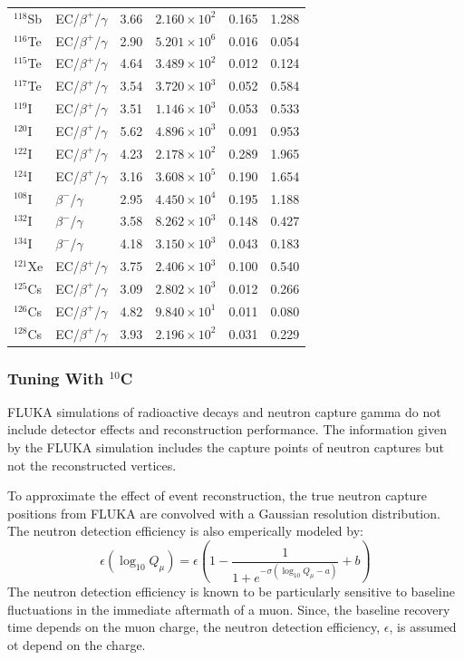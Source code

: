 \begin{table}[ht]
\begin{tabular}{lllccc}
$^{118}$Sb & EC/$\beta^+$/$\gamma$ & 3.66 & $2.160 \times 10^2$ & 0.165 & 1.288 \\
$^{116}$Te & EC/$\beta^+$/$\gamma$ & 2.90 & $5.201 \times 10^6$ & 0.016 & 0.054 \\
$^{115}$Te & EC/$\beta^+$/$\gamma$ & 4.64 & $3.489 \times 10^2$ & 0.012 & 0.124 \\
$^{117}$Te & EC/$\beta^+$/$\gamma$ & 3.54 & $3.720 \times 10^3$ & 0.052 & 0.584 \\
$^{119}$I & EC/$\beta^+$/$\gamma$ & 3.51 & $1.146 \times 10^3$ & 0.053 & 0.533 \\
$^{120}$I & EC/$\beta^+$/$\gamma$ & 5.62 & $4.896 \times 10^3$ & 0.091 & 0.953 \\
$^{122}$I & EC/$\beta^+$/$\gamma$ & 4.23 & $2.178 \times 10^2$ & 0.289 & 1.965 \\
$^{124}$I & EC/$\beta^+$/$\gamma$ & 3.16 & $3.608 \times 10^5$ & 0.190 & 1.654 \\
$^{108}$I & $\beta^-$/$\gamma$ & 2.95 & $4.450 \times 10^4$ & 0.195 & 1.188 \\
$^{132}$I & $\beta^-$/$\gamma$ & 3.58 & $8.262 \times 10^3$ & 0.148 & 0.427 \\
$^{134}$I & $\beta^-$/$\gamma$ & 4.18 & $3.150 \times 10^3$ & 0.043 & 0.183 \\
$^{121}$Xe & EC/$\beta^+$/$\gamma$ & 3.75 & $2.406 \times 10^3$ & 0.100 & 0.540 \\
$^{125}$Cs & EC/$\beta^+$/$\gamma$ & 3.09 & $2.802 \times 10^3$ & 0.012 & 0.266 \\
$^{126}$Cs & EC/$\beta^+$/$\gamma$ & 4.82 & $9.840 \times 10^1$ & 0.011 & 0.080 \\
$^{128}$Cs & EC/$\beta^+$/$\gamma$ & 3.93 & $2.196 \times 10^2$ & 0.031 & 0.229 \\
\hline
\end{tabular}
\end{table}

\subsubsection*{Tuning With $^{10}$C}
FLUKA simulations of radioactive decays and neutron capture gamma do not include detector effects and reconstruction performance. The information given by the FLUKA simulation includes the capture points of neutron captures but not the reconstructed vertices. 

To approximate the effect of event reconstruction, the true neutron capture positions from FLUKA are convolved with a Gaussian resolution distribution. The neutron detection efficiency is also emperically modeled by:
\begin{equation}
    \epsilon(\log_10Q_\mu)=\epsilon\left(1-\frac{1}{1+e^{-\sigma(\log_10Q_\mu-a)}}+b\right)
\end{equation}
The neutron detection efficiency is known to be particularly sensitive to baseline fluctuations in the immediate aftermath of a muon. Since, the baseline recovery time depends on the muon charge, the neutron detection efficiency, $\epsilon$, is assumed ot depend on the charge.

